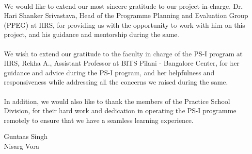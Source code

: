 \documentclass[12pt, a4paper]{report}
\begin{document}
\paragraph{}
We would like to extend our most sincere gratitude to our project in-charge, Dr. Hari Shanker Srivastava, Head of the Programme Planning and Evaluation Group (PPEG) at IIRS, for providing us with the opportunity to work with him on this project, and his guidance and mentorship during the same.
\paragraph{}
We wish to extend our gratitude to the faculty in charge of the PS-I program at IIRS, Rekha A., Assistant Professor at BITS Pilani - Bangalore Center, for her guidance and advice during the PS-I program, and her helpfulness and responsiveness while addressing all the concerns we raised during the same.
\paragraph{}
In addition, we would also like to thank the members of the Practice School Division, for their hard work and dedication in operating the PS-I programme remotely to ensure that we have a seamless learning experience.
\begin{flushright}
Guntaas Singh\\
Nisarg Vora
\end{flushright}
\pagebreak
\end{document}
